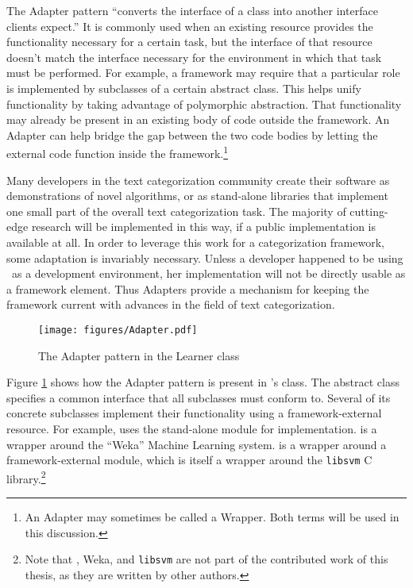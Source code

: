 The Adapter pattern ``converts the interface of a class into another
interface clients expect.'' \cite[p. 139]{gamma:95} It is commonly
used when an existing resource provides the functionality necessary
for a certain task, but the interface of that resource doesn't match
the interface necessary for the environment in which that task must be
performed.  For example, a framework may require that a particular
role is implemented by subclasses of a certain abstract class.  This
helps unify functionality by taking advantage of polymorphic
abstraction. \cite[p. 5]{fayad:99} That functionality may already be
present in an existing body of code outside the framework.  An Adapter
can help bridge the gap between the two code bodies by letting the
external code function inside the framework.\footnote{An Adapter may
sometimes be called a Wrapper.  Both terms will be used in this
discussion.}

Many developers in the text categorization community create their
software as demonstrations of novel algorithms, or as stand-alone
libraries that implement one small part of the overall text
categorization task.  The majority of cutting-edge research will be
implemented in this way, if a public implementation is available at
all.  In order to leverage this work for a categorization framework,
some adaptation is invariably necessary.  Unless a developer happened
to be using \aicat\ as a development environment, her implementation
will not be directly usable as a framework element.  Thus Adapters
provide a mechanism for keeping the framework current with advances in
the field of text categorization.

\begin{figure}
\texttt{[image: figures/Adapter.pdf]}
\caption{The Adapter pattern in the Learner class}
\label{Adapter-learner}
\end{figure}

Figure \ref{Adapter-learner} shows how the Adapter
pattern is present in \aicat's  class.  The abstract
 class specifies a common interface that all subclasses
must conform to.  Several of its concrete subclasses implement their
functionality using a framework-external resource.  For example,
 uses the stand-alone module
 for implementation.  
is a wrapper around the ``Weka'' Machine Learning system.
 is a wrapper around a framework-external
 module, which is itself a wrapper around the
\texttt{libsvm} C library.\cite{libsvm}\footnote{Note that
, Weka, and \texttt{libsvm} are not part of the
contributed work of this thesis, as they are written by other authors.}

